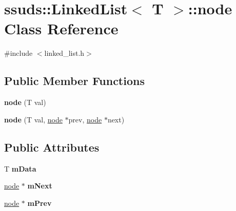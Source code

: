 \hypertarget{classssuds_1_1_linked_list_1_1node}{}\section{ssuds\+::Linked\+List$<$ T $>$\+::node Class Reference}
\label{classssuds_1_1_linked_list_1_1node}


{\ttfamily \#include $<$linked\+\_\+list.\+h$>$}

\subsection*{Public Member Functions}
\begin{DoxyCompactItemize}
\item 
\mbox{\label{classssuds_1_1_linked_list_1_1node_a221528e0e9f4083c5a2227415cc777b3}} 
{\bfseries node} (T val)
\item 
\mbox{\label{classssuds_1_1_linked_list_1_1node_a397dd825f91c842aa63dade188dbc8de}} 
{\bfseries node} (T val, \mbox{\hyperlink{classssuds_1_1_linked_list_1_1node}{node}} $\ast$prev, \mbox{\hyperlink{classssuds_1_1_linked_list_1_1node}{node}} $\ast$next)
\end{DoxyCompactItemize}
\subsection*{Public Attributes}
\begin{DoxyCompactItemize}
\item 
\mbox{\label{classssuds_1_1_linked_list_1_1node_ade62c934ca65d2c0817a273e46073847}} 
T {\bfseries m\+Data}
\item 
\mbox{\label{classssuds_1_1_linked_list_1_1node_a5cf68dc6a9b23008b6b931915e23e191}} 
\mbox{\hyperlink{classssuds_1_1_linked_list_1_1node}{node}} $\ast$ {\bfseries m\+Next}
\item 
\mbox{\label{classssuds_1_1_linked_list_1_1node_a8d307c24fff0faa6dfb41c875d643003}} 
\mbox{\hyperlink{classssuds_1_1_linked_list_1_1node}{node}} $\ast$ {\bfseries m\+Prev}
\end{DoxyCompactItemize}



